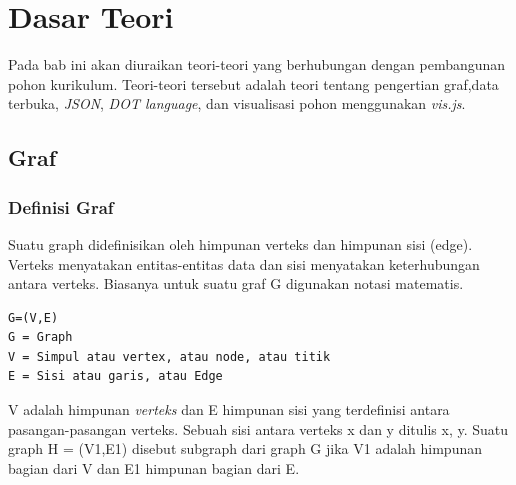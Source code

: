\chapter{Dasar Teori}
\label{chap:Dasar Teori}
Pada bab ini akan diuraikan teori-teori yang berhubungan dengan pembangunan pohon kurikulum. Teori-teori tersebut adalah teori tentang pengertian graf,data terbuka, \textit{JSON}, \textit{DOT language}, dan visualisasi pohon menggunakan \textit{vis.js}.

\section{Graf}
\label{sec: Graf}

\subsection{Definisi Graf}
\label{sec: Definisi Graf}
Suatu graph didefinisikan oleh himpunan verteks dan himpunan sisi (edge).
Verteks menyatakan entitas-entitas data dan sisi menyatakan keterhubungan antara
verteks. Biasanya untuk suatu graf G digunakan notasi matematis. 
\begin{lstlisting}
G=(V,E)
G = Graph
V = Simpul atau vertex, atau node, atau titik
E = Sisi atau garis, atau Edge
\end{lstlisting}

V adalah himpunan \textit{verteks} dan E himpunan sisi yang terdefinisi antara pasangan-pasangan verteks. Sebuah sisi antara verteks x dan y ditulis {x, y}. Suatu graph H = (V1,E1) disebut subgraph dari graph G jika V1 adalah himpunan bagian dari V dan E1 himpunan bagian dari E.
